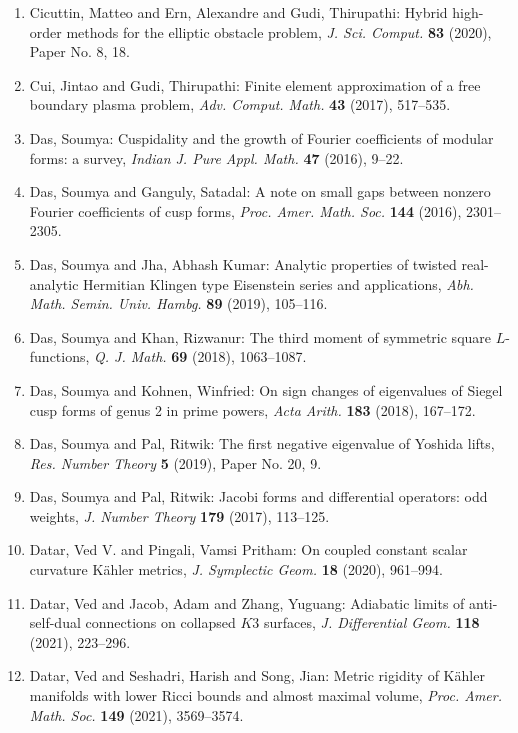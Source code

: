 \begin{enumerate}
{D}unkl-{H}ermite operator, \emph{Proc. Edinb. Math. Soc. (2)} {\bf 61} (2018), 513--544.
\item Cicuttin, Matteo and Ern, Alexandre and Gudi, Thirupathi: Hybrid high-order methods for the elliptic obstacle problem, \emph{J. Sci. Comput.} {\bf 83} (2020), Paper No. 8, 18.
\item Cui, Jintao and Gudi, Thirupathi: Finite element approximation of a free boundary plasma
problem, \emph{Adv. Comput. Math.} {\bf 43} (2017), 517--535.
\item Das, Soumya: Cuspidality and the growth of {F}ourier coefficients of
modular forms: a survey, \emph{Indian J. Pure Appl. Math.} {\bf 47} (2016), 9--22.
\item Das, Soumya and Ganguly, Satadal: A note on small gaps between nonzero {F}ourier coefficients of
cusp forms, \emph{Proc. Amer. Math. Soc.} {\bf 144} (2016), 2301--2305.
\item Das, Soumya and Jha, Abhash Kumar: Analytic properties of twisted real-analytic {H}ermitian
{K}lingen type {E}isenstein series and applications, \emph{Abh. Math. Semin. Univ. Hambg.} {\bf 89} (2019), 105--116.
\item Das, Soumya and Khan, Rizwanur: The third moment of symmetric square {$L$}-functions, \emph{Q. J. Math.} {\bf 69} (2018), 1063--1087.
\item Das, Soumya and Kohnen, Winfried: On sign changes of eigenvalues of {S}iegel cusp forms of genus
2 in prime powers, \emph{Acta Arith.} {\bf 183} (2018), 167--172.
\item Das, Soumya and Pal, Ritwik: The first negative eigenvalue of {Y}oshida lifts, \emph{Res. Number Theory} {\bf 5} (2019), Paper No. 20, 9.
\item Das, Soumya and Pal, Ritwik: Jacobi forms and differential operators: odd weights, \emph{J. Number Theory} {\bf 179} (2017), 113--125.
\item Datar, Ved V. and Pingali, Vamsi Pritham: On coupled constant scalar curvature {K}\"{a}hler metrics, \emph{J. Symplectic Geom.} {\bf 18} (2020), 961--994.
\item Datar, Ved and Jacob, Adam and Zhang, Yuguang: Adiabatic limits of anti-self-dual connections on collapsed
{$K3$} surfaces, \emph{J. Differential Geom.} {\bf 118} (2021), 223--296.
\item Datar, Ved and Seshadri, Harish and Song, Jian: Metric rigidity of {K}\"{a}hler manifolds with lower {R}icci
bounds and almost maximal volume, \emph{Proc. Amer. Math. Soc.} {\bf 149} (2021), 3569--3574.

\end{enumerate}
